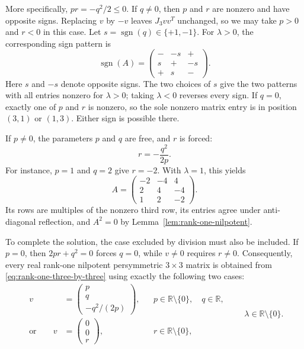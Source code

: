 \documentclass[11pt,a4paper]{article}
\begin{document}
More specifically, $pr=-q^2/2\leq0$. If $q\neq0$, then $p$ and $r$
are nonzero and have opposite signs. Replacing $v$ by $-v$ leaves
$J_3vv^T$ unchanged, so we may take $p>0$ and $r<0$ in this case.
Let $s=\operatorname{sgn}(q)\in\{+1,-1\}$. For $\lambda>0$, the
corresponding sign pattern is
\[
 \operatorname{sgn}(A)=
 \begin{pmatrix}
  -&-s&+\\
  s&+&-s\\
  +&s&-
 \end{pmatrix}.
\]
Here $s$ and $-s$ denote opposite signs. The two choices of $s$ give
the two patterns with all entries nonzero for $\lambda>0$; taking
$\lambda<0$ reverses every sign. If $q=0$, exactly one of $p$ and $r$
is nonzero, so the sole nonzero matrix entry is in position $(3,1)$ or
$(1,3)$. Either sign is possible there.

If $p\neq0$, the parameters $p$ and $q$ are free, and $r$ is forced:
\[
 r=-\frac{q^2}{2p}.
\]
For instance, $p=1$ and $q=2$ give $r=-2$. With $\lambda=1$, this yields
\[
 A=\begin{pmatrix}-2&-4&4\\2&4&-4\\1&2&-2\end{pmatrix}.
\]
Its rows are multiples of the nonzero third row, its entries agree under
anti-diagonal reflection, and $A^2=0$ by
Lemma~\ref{lem:rank-one-nilpotent}.

To complete the solution, the case excluded by division must also be
included. If $p=0$, then $2pr+q^2=0$ forces $q=0$, while $v\neq0$
requires $r\neq0$. Consequently, every real rank-one nilpotent
persymmetric $3\times3$ matrix is obtained from
\eqref{eq:rank-one-three-by-three} using exactly the following two cases:
\begin{equation}\label{eq:rank-one-three-parameters}
 \boxed{
 \begin{aligned}
  v&=\begin{pmatrix}p\\q\\-q^2/(2p)\end{pmatrix},
       &&p\in\mathbb R\setminus\{0\},\quad q\in\mathbb R,\\[6pt]
  \text{or}\qquad
  v&=\begin{pmatrix}0\\0\\r\end{pmatrix},
       &&r\in\mathbb R\setminus\{0\},
 \end{aligned}
 \qquad \lambda\in\mathbb R\setminus\{0\}.
 }
\end{equation}
\end{document}
